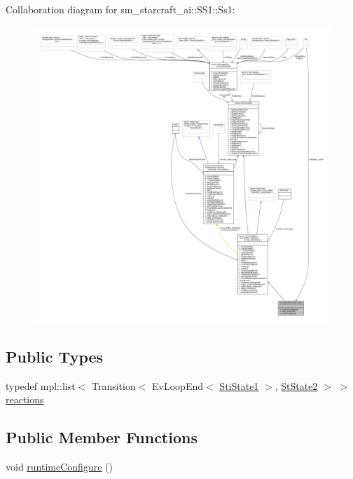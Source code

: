 Collaboration diagram for sm\+\_\+starcraft\+\_\+ai\+:\+:S\+S1\+:\+:Ss1\+:
\nopagebreak
\begin{figure}[H]
\begin{center}
\leavevmode
\includegraphics[width=350pt]{structsm__starcraft__ai_1_1SS1_1_1Ss1__coll__graph}
\end{center}
\end{figure}
\subsection*{Public Types}
\begin{DoxyCompactItemize}
\item 
typedef mpl\+::list$<$ Transition$<$ Ev\+Loop\+End$<$ \hyperlink{structsm__starcraft__ai_1_1inner__states_1_1StiState1}{Sti\+State1} $>$, \hyperlink{structsm__starcraft__ai_1_1StState2}{St\+State2} $>$ $>$ \hyperlink{structsm__starcraft__ai_1_1SS1_1_1Ss1_a847eb8599ebcda8061108c3770c1c648}{reactions}
\end{DoxyCompactItemize}
\subsection*{Public Member Functions}
\begin{DoxyCompactItemize}
\item 
void \hyperlink{structsm__starcraft__ai_1_1SS1_1_1Ss1_acddf6127382ff0ad5d64900cfd63220c}{runtime\+Configure} ()
\end{DoxyCompactItemize}
